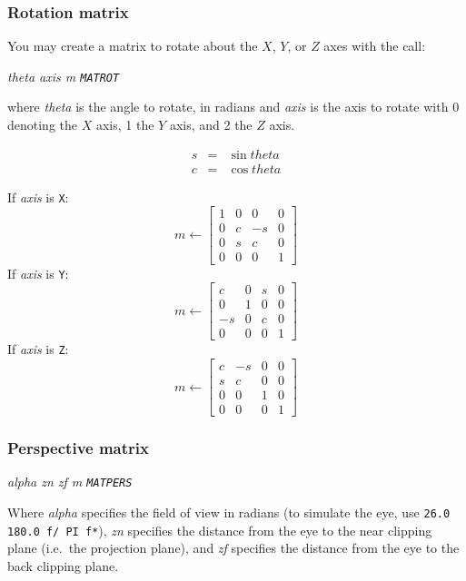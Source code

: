\documentclass{article}
\begin{document}
\subsubsection{Rotation matrix}

You may create a matrix to rotate about the $X$, $Y$, or $Z$ axes with
the call:

{\em theta axis m {\tt MATROT}}

where {\em theta} is the angle to rotate, in radians and {\em axis} is
the axis to rotate with 0 denoting the $X$ axis, 1 the $Y$ axis, and 2
the $Z$ axis.

\begin{eqnarray*}
        s & =  &\sin \mathit{theta}\\
        c & =  &\cos \mathit{theta}
\end{eqnarray*}

If {\em axis} is {\tt X}:
\[ m \leftarrow \left[ \begin{array}{cccc}
        1 & 0 & 0 & 0 \\
        0 & c & -s & 0 \\
        0 & s & c & 0 \\
        0 & 0 & 0 & 1
\end{array} \right] \]
If {\em axis} is {\tt Y}:
\[ m \leftarrow \left[ \begin{array}{cccc}
        c & 0 & s & 0 \\
        0 & 1 & 0 & 0 \\
        -s & 0 & c & 0 \\
        0 & 0 & 0 & 1
\end{array} \right] \]
If {\em axis} is {\tt Z}:
\[ m \leftarrow \left[ \begin{array}{cccc}
        c & -s & 0 & 0 \\
        s & c & 0 & 0 \\
        0 & 0 & 1 & 0 \\
        0 & 0 & 0 & 1
\end{array} \right] \]

\subsubsection{Perspective matrix}

{\em alpha zn zf m {\tt MATPERS}}

Where {\em alpha} specifies the field of view in radians (to simulate
the eye, use {\tt 26.0 180.0 f/ PI f*}), {\em zn} specifies the
distance from the eye to the near clipping plane (i.e.\ the projection
plane), and {\em zf} specifies the distance from the eye to the back
clipping plane.
\end{document}
